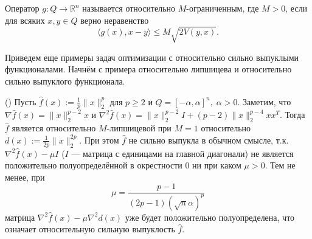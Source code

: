     \begin{definition}\label{DefRelBound}\cite{Main}
        Оператор $g: Q \longrightarrow \mathbb{R}^n$ называется относительно $M$-ограниченным, где $M >0$, если для всяких $x, y \in Q$ верно неравенство
        \begin{equation}\label{rel_bound}
             \langle g(x), x - y \rangle \leq M\sqrt{2V(y,x)}.
         \end{equation}
    \end{definition}
    \iffalse
        \begin{definition}\cite{Inex}
            \fixme{[FIXME] Мне кажется тоже нужно, но может стоит убрать} Назовём оператор $g: Q \longrightarrow \mathbb{R}^n$ относительно $L$-гладким, где $L > 0$, если для всяких $x, y, z \in Q$ верно неравенство
            \begin{equation}\label{rel_smooth}
                \langle g(y)-g(z),x-z\rangle \leq LV(x,z) + LV(z,y).
            \end{equation}
        \end{definition}
        Отметим, что если функция $f$ $L$-относительно гладкая \cite{Bauschke}, т.е.
        \begin{equation}\label{funct_rel_smooth}
            f(y) \leq f(x) + \langle \nabla f(x), y - x\rangle + LV(y, x) \quad \forall x, y \in Q,
        \end{equation}
        то оператор $g(x) = \nabla f(x)$ удовлетворяет \eqref{rel_smooth}. Однако в случае непотенциального оператора $g$ условие \eqref{rel_smooth} не сводится, вообще говоря, к \eqref{funct_rel_smooth} для какой-нибудь функции $f$.
    \fi

    Приведем еще примеры задач оптимизации с относительно сильно выпуклыми функционалами. Начнём с примера относительно липшицева и относительно сильно выпуклого функционала.

    \begin{example} (\cite{Zhou_NIPS_2020}) 
        Пусть $\widehat{f}(x) := \frac{1}{p} \|x\|_2^p$ для $p \geq 2$ и $ Q = [-\alpha, \alpha]^n, \; \alpha > 0$. Заметим, что $\nabla \widehat{f}(x) = \|x\|_2^{p - 2} x$ и $\nabla^2 \widehat{f}(x) = \|x\|_2^{p - 2} I + (p-2)\|x\|_2^{p - 4} x x^{T}$. Тогда $\widehat{f}$ является относительно $M$-липшицевой при $M = 1$ относительно $d(x) := \frac{1}{2p}\|x\|_2^{2p}$. При этом $\widehat{f}$ не сильно выпукла в обычном смысле, т.к. $\nabla^2 \widehat{f}(x) - \mu I$ ($I$ --- матрица с единицами на главной диагонали) не является положительно полуопределённой в окрестности 0 ни при каком $\mu >0$. Тем не менее, при 
        \begin{equation}\label{eq_mu}
            \mu = \frac{p-1}{(2p - 1)(\sqrt{n}\alpha)^p}  
        \end{equation}
        матрица $\nabla^2 \widehat{f}(x) - \mu \nabla^2 d(x)$ уже будет  положительно полуопределена, что означает относительную сильную выпуклость $\widehat{f}$.
        \label{ex_experiments}
    \end{example}

